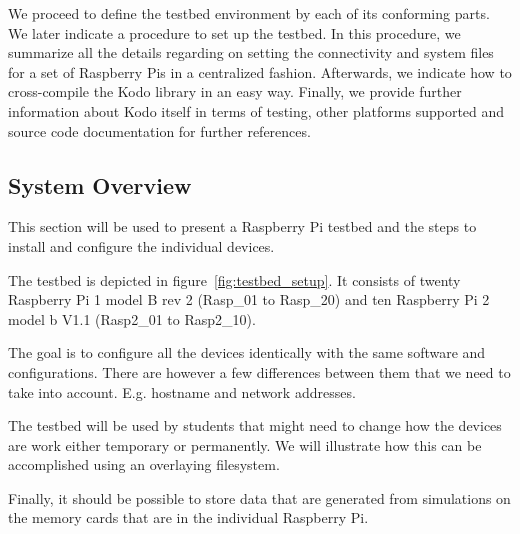 \label{sec:testbed}

We proceed to define the testbed environment by each of its conforming
parts. We later indicate a procedure to set up the testbed. In this procedure,
we summarize all the details regarding on setting the connectivity and
system files for a set of Raspberry Pis in a centralized fashion.
Afterwards, we indicate how to cross-compile the Kodo library in an
easy way. Finally, we provide further information about Kodo itself in terms
of testing, other platforms supported and source code documentation
for further references.

\subsection{System Overview}

This section will be used to present a Raspberry Pi testbed and the steps to
install and configure the individual devices.

The testbed is depicted in figure~\ref{fig:testbed_setup}. It consists of twenty
Raspberry Pi 1 model B rev 2 (Rasp\_01 to Rasp\_20) and 
ten Raspberry Pi 2 model b V1.1 (Rasp2\_01 to Rasp2\_10).

The goal is to configure all the devices identically with the same software
and configurations. There are however a few differences between them that we
need to take into account. E.g. hostname and network addresses.

The testbed will be used by students that might need to change how the
devices are work either temporary or permanently. We will illustrate how this
can be accomplished using an overlaying filesystem.

Finally, it should be possible to store data that are generated from
simulations on the memory cards that are in the individual Raspberry Pi.



